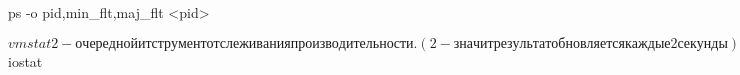 ps -o pid,min_flt,maj_flt <pid> 

$ vmstat 2 - очередной итструмент отслеживания производительности. (2 - значит
результат обновляется каждые 2 секунды).
Поля: %
proc:
 r - run
 b - blocked (запуск не разрешён)
memory:
 swpd - перемещено Kb на диск.
 free - свободно Kb памяти.
 buff - объём памяти для дисковых буферов.
swap:
 si - swap in.(не обязательно свап, может еще читать dll)
 so - swap out.
io:
 bi - blocks in
 bo - blocks out
system:
 in -
 cs -
cpu:
 us - %
 sy - %
 id - %
 wa - %

$ iostat
